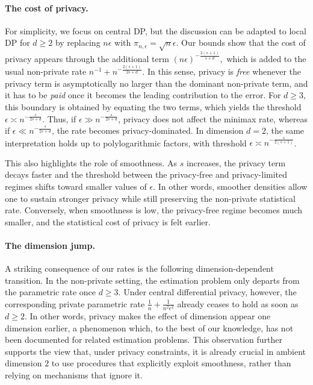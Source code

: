 \documentclass{article}
\newcommand{\1}{\mathds{1}}
\theoremstyle{plain}
\theoremstyle{definition}
\theoremstyle{remark}
\begin{document}
\paragraph{The cost of privacy.}
For simplicity, we focus on central DP, but the discussion can be adapted to local DP for $d \geq 2$ by replacing $n\epsilon$ with $\pi_{n,\epsilon} = \sqrt{n}\epsilon$. Our bounds show that the cost of privacy appears through the additional term
$
(n\epsilon)^{- \frac{2(s+1)}{s+d}},
$
which is added to the usual non-private rate
$
n^{-1} + n^{- \frac{2(s+1)}{2s+d}}.
$
In this sense, privacy is \emph{free} whenever the privacy term is asymptotically no larger than the dominant non-private term, and it has to be \emph{paid} once it becomes the leading contribution to the error. For $d \geq 3$, this boundary is obtained by equating the two terms, which yields the threshold
$
\epsilon \asymp n^{- \frac{s}{2s+d}}.
$
Thus, if $\epsilon \gg n^{- \frac{s}{2s+d}}$, privacy does not affect the minimax rate, whereas if $\epsilon \ll n^{- \frac{s}{2s+d}}$, the rate becomes privacy-dominated. In dimension $d=2$, the same interpretation holds up to polylogarithmic factors, with threshold $\epsilon \asymp n^{- \frac{s}{2(s+1)}}$.

This also highlights the role of smoothness. As $s$ increases, the privacy term decays faster and the threshold between the privacy-free and privacy-limited regimes shifts toward smaller values of $\epsilon$. In other words, smoother densities allow one to sustain stronger privacy while still preserving the non-private statistical rate. Conversely, when smoothness is low, the privacy-free regime becomes much smaller, and the statistical cost of privacy is felt earlier.


\paragraph{The dimension jump.}
A striking consequence of our rates is the following dimension-dependent transition. In the non-private setting, the estimation problem only departs from the parametric rate once $d \geq 3$. Under central differential privacy, however, the corresponding private parametric rate
$
\frac{1}{n} + \frac{1}{n^2 \epsilon^2}
$
already ceases to hold as soon as $d \geq 2$. In other words, privacy makes the effect of dimension appear one dimension earlier, a phenomenon which, to the best of our knowledge, has not been documented for related estimation problems. This observation further supports the view that, under privacy constraints, it is already crucial in ambient dimension $2$ to use procedures that explicitly exploit smoothness, rather than relying on mechanisms that ignore it.
\end{document}

